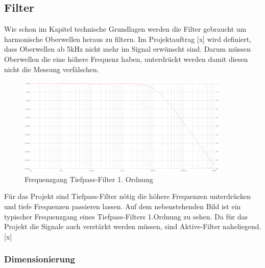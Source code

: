 \subsection{Filter}

Wie schon im Kapitel technische Grundlagen werden die Filter gebraucht um harmonische Oberwellen heraus zu filtern. Im Projektauftrag [x] wird definiert, dass Oberwellen ab 5kHz nicht mehr im Signal erwünscht sind. Darum müssen Oberwellen die eine höhere Frequenz haben, unterdrückt werden damit diesen nicht die Messung verfälschen.

\begin{minipage}[h]{0.5\textwidth} 
\begin{figure}[H]
\begin{center}
\includegraphics[width=0.9\textwidth]{images/Analoge_Schaltung_Frequenzgang.png}
\caption{Frequenzgang Tiefpass-Filter 1. Ordnung}
\end{center}
\end{figure}
\end{minipage}
\begin{minipage}[h]{0.5\textwidth}
Für das Projekt sind Tiefpass-Filter nötig die höhere Frequenzen unterdrücken und tiefe Frequenzen passieren lassen. Auf dem nebenstehenden Bild ist ein typischer Frequenzgang eines Tiefpass-Filters 1.Ordnung zu sehen. Da für das Projekt die Signale auch verstärkt werden müssen, sind Aktive-Filter naheliegend.[x]
\end{minipage}


\subsubsection*{Dimensionierung}

